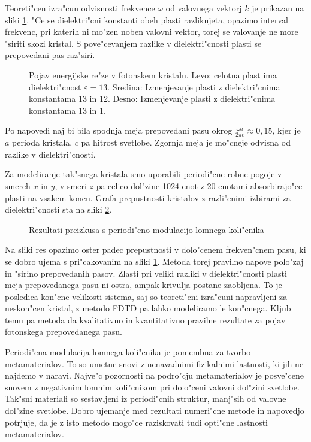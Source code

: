 \documentclass[12pt,twoside,openright,final]{report}
\begin{document}
Teoreti"cen izra"cun odvisnosti frekvence $\omega$ od valovnega vektorj $k$ je prikazan na sliki \ref{fig:joannopoulos-crystal}. 
"Ce se dielektri"cni konstanti obeh plasti razlikujeta, opazimo interval frekvenc, pri katerih ni mo"zen noben valovni vektor, torej se valovanje ne more "siriti skozi kristal. 
S pove"cevanjem razlike v dielektri"cnosti plasti se prepovedani pas raz"siri. 

\begin{figure}[h]
\centering
  
 \caption{Pojav energijske re"ze v fotonskem kristalu. Levo: celotna plast ima dielektri"cnost $\varepsilon = 13$. Sredina: Izmenjevanje plasti z dielektri"cnima konstantama 13 in 12. Desno: Izmenjevanje plasti z dielektri"cnima konstantama 13 in 1. \cite{joannopoulos}}
 \label{fig:joannopoulos-crystal}
\end{figure}

Po napovedi naj bi bila spodnja meja prepovedani pasu okrog $\frac{\omega a}{2\pi c} \approx 0,\!15$, kjer je $a$ perioda kristala, $c$ pa hitrost svetlobe. 
Zgornja meja je mo"cneje odvisna od razlike v dielektri"cnosti\cite{joannopoulos}. 

Za modeliranje tak"snega kristala smo uporabili periodi"cne robne pogoje v smereh $x$ in $y$, v smeri $z$ pa celico dol"zine 1024 enot z 20 enotami absorbirajo"ce plasti na vsakem koncu. 
Grafa prepustnosti kristalov z razli"cnimi izbirami za dielektri"cnosti sta na sliki \ref{fig:test-periodic}. 

\begin{figure}[!htbp]
 
 \caption{Rezultati preizkusa s periodi"cno modulacijo lomnega koli"cnika}
 \label{fig:test-periodic}
\end{figure}

Na sliki res opazimo oster padec prepustnosti v dolo"cenem frekven"cnem pasu, ki se dobro ujema s pri"cakovanim na sliki \ref{fig:joannopoulos-crystal}. 
Metoda torej pravilno napove polo"zaj in "sirino prepovedanih pasov. 
Zlasti pri veliki razliki v dielektri"cnosti plasti meja prepovedanega pasu ni ostra, ampak krivulja postane zaobljena. 
To je posledica kon"cne velikosti sistema, saj so teoreti"cni izra"cuni napravljeni za neskon"cen kristal, z metodo \acs{FDTD} pa lahko modeliramo le kon"cnega. 
Kljub temu pa metoda da kvalitativno in kvantitativno pravilne rezultate za pojav fotonskega prepovedanega pasu. 

Periodi"cna modulacija lomnega koli"cnika je pomembna za tvorbo metamaterialov\cite{metamaterials}. 
To so umetne snovi z nenavadnimi fizikalnimi lastnosti, ki jih ne najdemo v naravi. 
Najve"c pozornosti na podro"cju metamaterialov je posve"cene snovem z negativnim lomnim koli"cnikom pri dolo"ceni valovni dol"zini svetlobe. 
Tak"sni materiali so sestavljeni iz periodi"cnih struktur, manj"sih od valovne dol"zine svetlobe. 
Dobro ujemanje med rezultati numeri"cne metode in napovedjo potrjuje, da je z isto metodo mogo"ce raziskovati tudi opti"cne lastnosti metamaterialov. 
\end{document}

